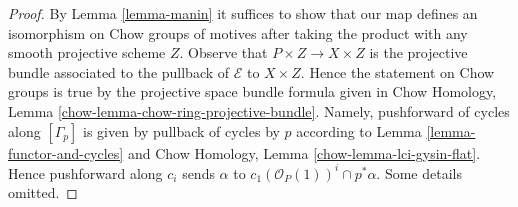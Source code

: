 \documentclass[10pt,a4paper]{amsart}
\theoremstyle{plain}
\theoremstyle{definition}
\theoremstyle{remark}
\numberwithin{equation}{subsection}
\begin{document}
\begin{proof}
By Lemma \ref{lemma-manin} it suffices to show that
our map defines an isomorphism on Chow groups of motives
after taking the product with any smooth projective scheme $Z$.
Observe that $P \times Z \to X \times Z$ is the projective
bundle associated to the pullback of $\mathcal{E}$ to $X \times Z$.
Hence the statement on Chow groups is true by the projective space bundle
formula given in
Chow Homology, Lemma \ref{chow-lemma-chow-ring-projective-bundle}.
Namely, pushforward of cycles along $[\Gamma_p]$ is given by pullback
of cycles by $p$ according to Lemma \ref{lemma-functor-and-cycles} and
Chow Homology, Lemma \ref{chow-lemma-lci-gysin-flat}. Hence pushforward
along $c_i$ sends $\alpha$ to $c_1(\mathcal{O}_P(1))^i \cap p^*\alpha$.
Some details omitted.
\end{proof}
\end{document}
